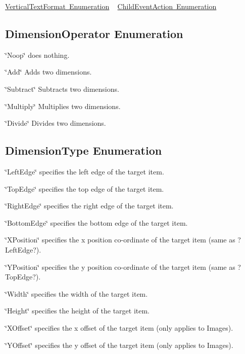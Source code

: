  \mbox{\hyperlink{fal_enum_ref_fal_enum_ref_sec_11}{Vertical\+Text\+Format Enumeration}} ~\newline
 \mbox{\hyperlink{fal_enum_ref_fal_enum_ref_sec_12}{Child\+Event\+Action Enumeration}} ~\newline
\hypertarget{fal_enum_ref_fal_enum_ref_sec_1}{}\subsection{Dimension\+Operator Enumeration}\label{fal_enum_ref_fal_enum_ref_sec_1}
\begin{DoxyItemize}
\item {\ttfamily \char`\"{}\+Noop\char`\"{}} does nothing. \item {\ttfamily \char`\"{}\+Add\char`\"{}} Adds two dimensions. \item {\ttfamily \char`\"{}\+Subtract\char`\"{}} Subtracts two dimensions. \item {\ttfamily \char`\"{}\+Multiply\char`\"{}} Multiplies two dimensions. \item {\ttfamily \char`\"{}\+Divide\char`\"{}} Divides two dimensions.\end{DoxyItemize}
\hypertarget{fal_enum_ref_fal_enum_ref_sec_2}{}\subsection{Dimension\+Type Enumeration}\label{fal_enum_ref_fal_enum_ref_sec_2}
\begin{DoxyItemize}
\item {\ttfamily \char`\"{}\+Left\+Edge\char`\"{}} specifies the left edge of the target item. \item {\ttfamily \char`\"{}\+Top\+Edge\char`\"{}} specifies the top edge of the target item. \item {\ttfamily \char`\"{}\+Right\+Edge\char`\"{}} specifies the right edge of the target item. \item {\ttfamily \char`\"{}\+Bottom\+Edge\char`\"{}} specifies the bottom edge of the target item. \item {\ttfamily \char`\"{}\+X\+Position\char`\"{}} specifies the x position co-\/ordinate of the target item (same as ?Left\+Edge?). \item {\ttfamily \char`\"{}\+Y\+Position\char`\"{}} specifies the y position co-\/ordinate of the target item (same as ?Top\+Edge?). \item {\ttfamily \char`\"{}\+Width\char`\"{}} specifies the width of the target item. \item {\ttfamily \char`\"{}\+Height\char`\"{}} specifies the height of the target item. \item {\ttfamily \char`\"{}\+X\+Offset\char`\"{}} specifies the x offset of the target item (only applies to Images). \item {\ttfamily \char`\"{}\+Y\+Offset\char`\"{}} specifies the y offset of the target item (only applies to Images).\end{DoxyItemize}
